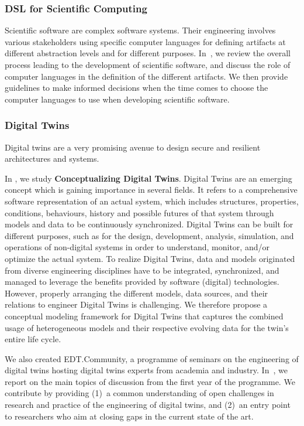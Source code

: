 \subsubsection{DSL for Scientific Computing}

Scientific software are complex software systems. Their engineering involves various stakeholders using specific computer languages for defining artifacts at different abstraction levels and for different purposes. In~\cite{leroy:hal-03799289}, we review the overall process leading to the development of scientific software, and discuss the role of computer languages in the definition of the different artifacts. We then provide guidelines to make informed decisions when the time comes to choose the computer languages to use when developing scientific software.


\subsubsection{Digital Twins}

Digital twins are a very promising avenue to design secure and resilient architectures and systems.

In \cite{eramo:hal-03466396}, we study \textbf{Conceptualizing Digital Twins}.
              Digital Twins are an emerging concept which is gaining importance in several fields. It refers to a comprehensive software representation of an actual system, which includes structures, properties, conditions, behaviours, history and possible futures of that system through models and data to be continuously synchronized. Digital Twins can be built for different purposes, such as for the design, development, analysis, simulation, and operations of non-digital systems in order to understand, monitor, and/or optimize the actual system. To realize Digital Twins, data and models originated from diverse engineering disciplines have to be integrated, synchronized, and managed to leverage the benefits provided by software (digital) technologies. However, properly arranging the different models, data sources, and their relations to engineer Digital Twins is challenging. We therefore propose a conceptual modeling framework for Digital Twins that captures the combined usage of heterogeneous models and their respective evolving data for the twin's entire life cycle. 
              
              
We also created EDT.Community, a programme of seminars on the engineering of digital twins hosting digital twins experts from academia and industry. In~\cite{cleophas:hal-03933973}, we report on the main topics of discussion from the first year of the programme. We contribute by providing (1)~a common understanding of open challenges in research and practice of the engineering of digital twins, and (2)~an entry point to researchers who aim at closing gaps in the current state of the art.    

